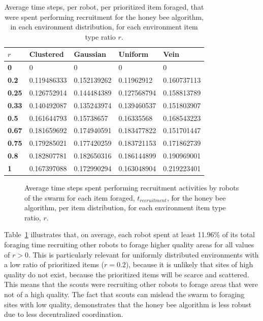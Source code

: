 \begin{table}[!htbp]
\centering
\caption{Average time steps, per robot, per prioritized item foraged, that were spent performing recruitment for the honey bee algorithm, in each environment distribution, for each environment item type ratio $r$.}
\label{averagetimerecruitment}
\begin{tabular}{@{}lllll@{}}
\toprule
$r$            & \textbf{Clustered} & \textbf{Gaussian} & \textbf{Uniform} & \textbf{Vein} \\ \midrule
\textbf{0}        & 0        & 0       & 0      & 0   \\
\textbf{0.2}      & 0.119486333        & 0.152139262       & 0.11962912       & 0.160737113   \\
\textbf{0.25}     & 0.126752914        & 0.144484389       & 0.127568794      & 0.158813789   \\
\textbf{0.33} & 0.140492087        & 0.135243974       & 0.139460537      & 0.151803907   \\
\textbf{0.5}      & 0.161644793        & 0.15738657        & 0.16335568       & 0.168543223   \\
\textbf{0.67} & 0.181659692        & 0.174940591       & 0.183477822      & 0.151701447   \\
\textbf{0.75}     & 0.179285021        & 0.177420259       & 0.183721153      & 0.171862739   \\
\textbf{0.8}      & 0.182807781        & 0.182650316       & 0.186144899      & 0.190969001   \\
\textbf{1}        & 0.167397088        & 0.172990294       & 0.163048904      & 0.219223401   \\ \bottomrule
\end{tabular}
\end{table}


\begin{figure}[!htbp]
\centering
\resizebox{\textwidth}{!}{}
\caption{Average time steps spent performing recruitment activities by robots of the swarm for each item foraged, $t_{recruitment}$, for the honey bee algorithm, per item distribution, for each environment item type ratio, $r$.}
\label{fig:recruitmenttime}
\end{figure}

Table~\ref{averagetimerecruitment} illustrates that, on average, each robot spent at least 11.96\% of its total foraging time recruiting other robots to forage higher quality areas for all values of $r > 0$. This is particularly relevant for uniformly distributed environments with a low ratio of prioritized items ($r = 0.2$), because it is unlikely that sites of high quality do not exist, because the prioritized items will be scarce and scattered. This means that the scouts were recruiting other robots to forage areas that were not of a high quality. The fact that scouts can mislead the swarm to foraging sites with low quality, demonstrates that the honey bee algorithm is less robust due to less decentralized coordination.


